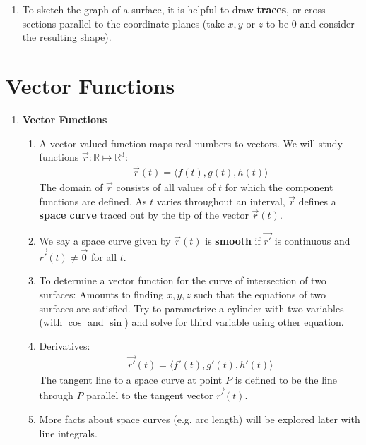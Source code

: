 \documentclass[10pt]{article}
\begin{document}
\begin{multicols*}{2}
\begin{enumerate}
\begin{enumerate}
    \item To sketch the graph of a surface, it is helpful to draw \textbf{traces}, or cross-sections parallel to the coordinate planes (take $x,y$ or $z$ to be 0 and consider the resulting shape).
\end{enumerate}
\end{enumerate}
\section{Vector Functions}
\begin{enumerate}
    \item \textbf{Vector Functions}
    \begin{enumerate}
        \item A vector-valued function maps real numbers to vectors. We will study functions $\vec{r}: \mathbb{R} \mapsto \mathbb{R}^3$:
        \begin{align*}
            \vec{r}(t) = \langle f(t), g(t), h(t) \rangle
        \end{align*}
        The domain of $\vec{r}$ consists of all values of $t$ for which the component functions are defined. As $t$ varies throughout an interval, $\vec{r}$ defines a \textbf{space curve} traced out by the tip of the vector $\vec{r}(t)$. 
        
        \item We say a space curve given by $\vec{r}(t)$ is \textbf{smooth} if $\vec{r'}$ is continuous and $\vec{r'}(t) \neq \vec{0}$ for all $t$.
        
        \item To determine a vector function for the curve of intersection of two surfaces: Amounts to finding $x,y,z$ such that the equations of two surfaces are satisfied. Try to parametrize a cylinder with two variables (with $\cos$ and $\sin$) and solve for third variable using other equation.
        
        \item Derivatives:
        \begin{align*}
            \vec{r'}(t) = \langle f'(t), g'(t), h'(t) \rangle
        \end{align*}
        The tangent line to a space curve at point $P$ is defined to be the line through $P$ parallel to the tangent vector $\vec{r'}(t)$.
        
        \item More facts about space curves (e.g. arc length) will be explored later with line integrals. 
        

\end{enumerate}
\end{enumerate}
\end{multicols*}
\end{document}
